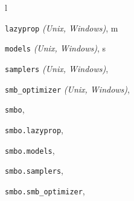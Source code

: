 \documentclass[letterpaper,10pt,english]{sphinxmanual}
\begin{document}
\renewcommand{\indexname}{Python Module Index}
\begin{theindex}
\def\bigletter#1{{\Large\sffamily#1}\nopagebreak\vspace{1mm}}
\bigletter{l}
\item {\texttt{lazyprop}} \emph{(Unix, Windows)}, \pageref{index:module-lazyprop}
\indexspace
\bigletter{m}
\item {\texttt{models}} \emph{(Unix, Windows)}, \pageref{index:module-models}
\indexspace
\bigletter{s}
\item {\texttt{samplers}} \emph{(Unix, Windows)}, \pageref{index:module-samplers}
\item {\texttt{smb\_optimizer}} \emph{(Unix, Windows)}, \pageref{index:module-smb_optimizer}
\item {\texttt{smbo}}, \pageref{index:module-smbo}
\item {\texttt{smbo.lazyprop}}, \pageref{index:module-smbo.lazyprop}
\item {\texttt{smbo.models}}, \pageref{index:module-smbo.models}
\item {\texttt{smbo.samplers}}, \pageref{index:module-smbo.samplers}
\item {\texttt{smbo.smb\_optimizer}}, \pageref{index:module-smbo.smb_optimizer}
\end{theindex}

\renewcommand{\indexname}{Index}
\printindex
\end{document}
